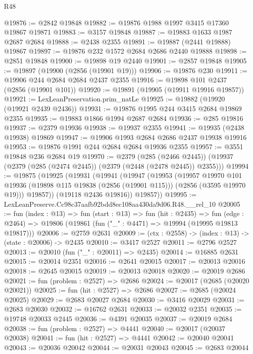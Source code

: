 \begin{lexlean}{R48}
\begin{coremodule}
@19876 := @2842 @19848
@19882 := @19876 @1988 @1997 @3415 @17360 @19867 @19871
@19883 := @3157 @19848
@19887 := @19883 @1633 @1987 @2687 @2684
@19888 := @2438 @2355
@19891 := @19887 (@2441 @19888) @19867
@19897 := @19876 @232 @1572 @2684 @2686 @2440 @19888
@19898 := @2851 @19848
@19900 := @19898 @19 @2440
@19901 := @2857 @19848
@19905 := @19897 (@19900 (@2856 (@19901 @19)))
@19906 := @19876 @230
@19911 := @19906 @244 @2684 @2684 @2437 @2355
@19916 := @19898 @101 @2437 (@2856 (@19901 @101))
@19920 := @19891 (@19905 (@19911 @19916 @19857))
@19921 := LexLeanPreservation.prim_natLe
@19925 := @19882 (@19920 (@19921 @2439 @2436))
@19931 := @19876 @1995 @244 @3415 @2684 @19869 @2355
@19935 := @19883 @1866 @1994 @2687 @2684
@19936 := @285 @19816
@19937 := @2379 @19936
@19938 := @19937 @2355
@19941 := @19935 (@2438 @19938) @19869
@19947 := @19906 @1993 @2684 @2686 @2437 @19938 @19916
@19953 := @19876 @1991 @244 @2684 @2684 @19936 @2355
@19957 := @3551 @19848 @236 @2684 @19
@19970 := @2379
    (@285 (@2466 @2445))
    (@19937 (@2379 (@285 (@2474 @2445)) (@2379 (@2448 (@2478 @2445)) @2355)))
@19994 := @19875
    (@19925
      (@19931
        (@19941
          (@19947
            (@19953
              (@19957
                @19970
                @101
                @19936
                (@19898 @115 @19838 (@2856 (@19901 @115)))
                (@2856 (@3595 @19970 @19)))
              @19857))
          (@19118 @2436 @19816))
        @19857))
@19995 := LexLeanPreserve.Cc98c37aafb92bdd8ec108aa430da9d06.R48.__rel_10
@20005 := fun (index : @13) =>
  fun (start : @13) =>
  fun (hit : @2435) =>
  fun (edge : @2464) => @19806 (@19861 (fun ("_" : @4471) => @19994 (@19995 @19813 @19817)))
@20006 := @2759 @2631
@20009 := (ctx : @2558) -> (index : @13) -> (state : @20006) -> @2435
@20010 := @3417 @2527
@20011 := @2796 @2527
@20013 := @20010 (fun ("_" : @20011) => @2435)
@20014 := @16885 @2631
@20015 := @20014 @2351
@20016 := @2641 @20015
@20017 := @20013 @20016
@20018 := @2645 @20015
@20019 := @20013 @20018
@20020 := @20019 @2686
@20021 := fun (problem : @2527) => @2686
@20024 := @20017 (@2685 (@20020 @20021))
@20025 := fun (hit : @2527) => @2686
@20027 := @2685 (@20024 @20025)
@20029 := @2683 @20027 @2684
@20030 := @3416 @20029
@20031 := @2683 @20030
@20032 := @16762 @2631
@20033 := @20032 @2351
@20035 := @19748 @20033 @2445
@20036 := @4391 @20035
@20037 := @20019 @2684
@20038 := fun (problem : @2527) => @4441
@20040 := @20017 (@20037 @20038)
@20041 := fun (hit : @2527) => @4441
@20042 := @20040 @20041
@20043 := @20036 @20042
@20044 := @20031 @20043
@20045 := @2683 @20044

\end{coremodule}
\end{lexlean}
